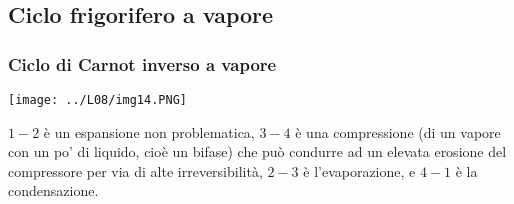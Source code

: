 \subsection{Ciclo frigorifero a vapore}
\subsubsection{Ciclo di Carnot inverso a vapore}
\begin{center}
    \texttt{[image: ../L08/img14.PNG]}
\end{center}
$1-2$ è un espansione non problematica, $3-4$ è una compressione (di un vapore con un po' di liquido, cioè un bifase) che può condurre ad un elevata erosione del compressore per via di alte irreversibilità, $2-3$ è l'evaporazione, e $4-1$ è la condensazione.